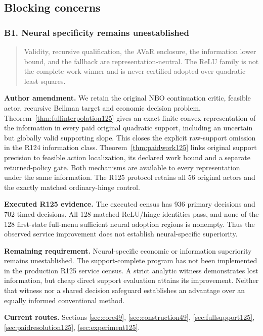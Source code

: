 \subsection{Blocking concerns}

\subsubsection{B1. Neural specificity remains unestablished}

\begin{quote}\small
Validity, recursive qualification, the AVaR enclosure, the information lower bound, and the fallback are representation-neutral. The ReLU family is not the complete-work winner and is never certified adopted over quadratic least squares.
\end{quote}

\noindent\textbf{Author amendment.} We retain the original NBO continuation critic, feasible actor, recursive Bellman target and economic decision problem. Theorem~\ref{thm:fullinterpolation125} gives an exact finite convex representation of the information in every paid original quadratic support, including an uncertain but globally valid supporting slope. This closes the explicit raw-support omission in the R124 information class. Theorem~\ref{thm:paidwork125} links original support precision to feasible action localization, its declared work bound and a separate returned-policy gate. Both mechanisms are available to every representation under the same information. The R125 protocol retains all 56 original actors and the exactly matched ordinary-hinge control.

\noindent\textbf{Executed R125 evidence.} The executed census has 936 primary decisions and 702 timed decisions. All 128 matched ReLU/hinge identities pass, and none of the 128 first-state full-menu sufficient neural adoption regions is nonempty. Thus the observed service improvement does not establish neural-specific superiority.

\noindent\textbf{Remaining requirement.} Neural-specific economic or information superiority remains unestablished. The support-complete program has not been implemented in the production R125 service census. A strict analytic witness demonstrates lost information, but cheap direct support evaluation attains its improvement. Neither that witness nor a shared decision safeguard establishes an advantage over an equally informed conventional method.

\noindent\textbf{Current routes.} Sections \ref{sec:core49}, \ref{sec:construction49}, \ref{sec:fullsupport125}, \ref{sec:paidresolution125}, \ref{sec:experiment125}.

